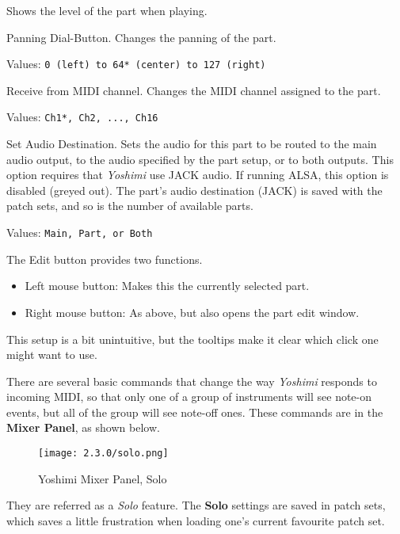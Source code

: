    Shows the level of the part when playing.

   Panning Dial-Button.
   Changes the panning of the part.

   Values: \texttt{0 (left) to 64* (center) to 127 (right)}

   Receive from MIDI channel.
   Changes the MIDI channel assigned to the part.

   Values: \texttt{Ch1*, Ch2, ..., Ch16}

   Set Audio Destination.
   Sets the audio for this part to be routed to the main audio output, to
   the audio specified by the part setup, or to both outputs.
   This option requires that \textsl{Yoshimi} use JACK audio.  If running
   ALSA, this option is disabled (greyed out).
   The part's audio destination (JACK) is saved with the patch sets, and
   so is the number of available parts.

   Values: \texttt{Main, Part, or Both}

   The Edit button provides two functions.
   \begin{itemize}
      \item Left mouse button: Makes this the currently selected part.
      \item Right mouse button: As above, but also opens the part edit window.
   \end{itemize}
   This setup is a bit unintuitive, but the tooltips make it clear
   which click one might want to use.

   There are several basic commands that change the way
   \textsl{Yoshimi} responds to incoming MIDI,
   so that only one of a group of instruments will see note-on events, but all
   of the group will see note-off ones. These commands
   are in the \textbf{Mixer Panel}, as shown below.
\begin{figure}[H]
   \centering
   \texttt{[image: 2.3.0/solo.png]}
   \caption[Yoshimi Mixer Panel]{Yoshimi Mixer Panel, Solo}
   \label{fig:yoshimi_part_panel_solo}
\end{figure}
   They are referred as a \textsl{Solo} feature.
   The \textbf{Solo} settings are saved in patch sets, which saves a
   little frustration when loading one's current favourite patch set.

